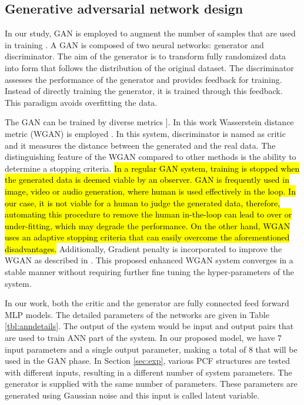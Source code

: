 \documentclass[journal]{IEEEtran}
\begin{document}
\subsection{Generative adversarial network design}
\label{ssec:gan}
In our study, GAN is employed to augment the number of samples that are used in training  \cite{goodfellow2014generative}. A GAN is composed of two neural networks: generator and discriminator. The aim of the generator is to transform fully randomized data into form that follows the distribution of the original dataset. The discriminator assesses the performance of the generator and provides feedback for training. Instead of directly training the generator, it is trained through this feedback. This paradigm avoids overfitting the data.

The GAN can be trained by diverse metrics \cite{goodfellow2014generative, lucic2018gans}]. In this work Wasserstein distance metric (WGAN) is employed \cite{arjovsky2017wasserstein}. In this system, discriminator is named as critic and it measures the distance between the generated and the real data. The distinguishing feature of the WGAN compared to other methods is the ability to determine a stopping criteria. \hl{In a regular GAN system, training is stopped when the generated data is deemed viable by an observer. GAN is frequently used in image, video or audio generation, where human is used effectively in the loop. In our case, it is not viable for a human to judge the generated data, therefore, automating this procedure to remove the human in-the-loop can lead to over or under-fitting, which may degrade the performance. On the other hand, WGAN uses an adaptive stopping criteria that can easily overcome the aforementioned disadvantages.} Additionally, Gradient penalty is incorporated to improve the WGAN as described in \cite{gulrajani2017improved}. This proposed enhanced WGAN system converges in a stable manner without requiring further fine tuning the hyper-parameters of the system. %

In our work, both the critic and the generator are fully connected feed forward MLP models. The detailed parameters of the networks are given in Table \ref{tbl:anndetails}. The output of the system would be input and output pairs that are used to train ANN part of the system. In our proposed model, we have 7 input parameters and a single output parameter, making a total of 8 that will be used in the GAN phase. In Section  \ref{sec:exp}, various PCF structures are tested with different inputs, resulting in a different number of system parameters. The generator is supplied with the same number of parameters. These parameters are generated using Gaussian noise and this input is called latent variable.
\end{document}
